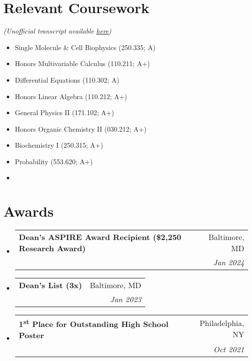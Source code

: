 \documentclass[letterpaper,11pt]{article}
\makeatletter
\newcommand{\resumeSubheading}[4]{
  \vspace{-1pt}\item
    \begin{tabular*}{0.98\textwidth}[t]{l@{\extracolsep{\fill}}r}
      \textbf{#1} & #2 \\
      \makecell[l]{\textit{\small#3}} & \textit{\small #4} \\
    \end{tabular*}\vspace{-5pt}
}
\newcommand{\resumeSubHeadingListStart}{\begin{itemize}[leftmargin=*,rightmargin=\dimexpr\linewidth-0.9\textwidth-\leftmargin\relax]}
\newcommand{\resumeSubHeadingListEnd}{\end{itemize}}
\makeatother
\begin{document}

\section{Relevant Coursework}

  \textit{(Unofficial transcript available \href{https://raw.githubusercontent.com/ArmaanAhmed22/resume/master/Transcript.pdf}{\underline{here}})}



  \begin{multicols}{3}
    \begin{itemize}[leftmargin=*]
      \item Single Molecule \& Cell Biophysics (250.335; A)
      \item Honors Multivariable Calculus (110.211; A+)
      \item Differential Equations (110.302; A)
      \item Honors Linear Algebra (110.212; A+)
      \item General Physics II (171.102; A+)
      \item Honors Organic Chemistry II (030.212; A+)
      \item Biochemistry I (250.315; A+)
      \item Probability (553.620; A+)
      \item[\vspace{\fill}]
    \end{itemize}
        
  \end{multicols}

\section{Awards}
  \resumeSubHeadingListStart

    \resumeSubheading{Dean's ASPIRE Award Recipient (\$2,250 Research Award)}{Baltimore, MD}{The Johns Hopkins University}{Jan 2024}

    \resumeSubheading{Dean's List (3x)}{Baltimore, MD}{The Johns Hopkins University}{Jan 2023}

    \resumeSubheading{1\textsuperscript{st} Place for Outstanding High School Poster}{Philadelphia, NY}{Discovery Day 2021, Drexel University}{Oct 2021}

  \resumeSubHeadingListEnd

\end{document}
